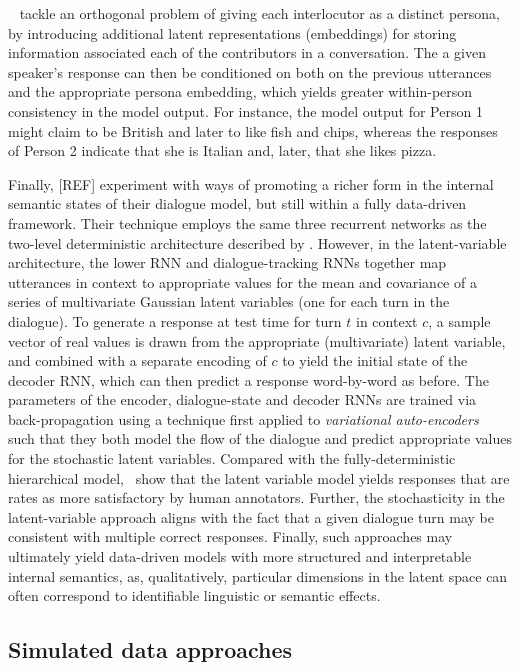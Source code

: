 \documentclass[11pt,letterpaper]{article}
\begin{document}
~\cite{li2016persona} tackle an orthogonal problem of giving each interlocutor as a distinct persona, by introducing additional latent representations (embeddings) for storing information associated each of the contributors in a conversation. The a given speaker's response can then be conditioned on both on the previous utterances and the appropriate persona embedding, which yields greater within-person consistency in the model output. For instance, the model output for Person 1 might claim to be British and later to like fish and chips, whereas the responses of Person 2 indicate that she is Italian and, later, that she likes pizza.

Finally, [REF] experiment with ways of promoting a richer form in the internal semantic states of their dialogue model, but still within a fully data-driven framework. Their technique employs the same three recurrent networks as the two-level deterministic architecture described by . However, in the latent-variable architecture, the lower RNN and dialogue-tracking RNNs together map utterances in context to appropriate values for the mean and covariance of a series of multivariate Gaussian latent variables (one for each turn in the dialogue). To generate a response at test time for turn \(t\) in context \(c\), a sample vector of real values is drawn from the appropriate (multivariate) latent variable, and combined with a separate encoding of \(c\) to yield the initial state of the decoder RNN, which can then predict a response word-by-word as before. The parameters of the encoder, dialogue-state and decoder RNNs are trained via back-propagation using a technique first applied to \emph{variational auto-encoders}~\cite{kingma2013auto} such that they both model the flow of the dialogue and predict appropriate values for the stochastic latent variables. Compared with the fully-deterministic hierarchical model,~ show that the latent variable model yields responses that are rates as more satisfactory by human annotators. Further, the stochasticity in the latent-variable approach aligns with the fact that a given dialogue turn may be consistent with multiple correct responses. Finally, such approaches may ultimately yield data-driven models with more structured and interpretable internal semantics, as, qualitatively, particular dimensions in the latent space can often correspond to identifiable linguistic or semantic effects. 

\subsection{Simulated data approaches}
\end{document}
